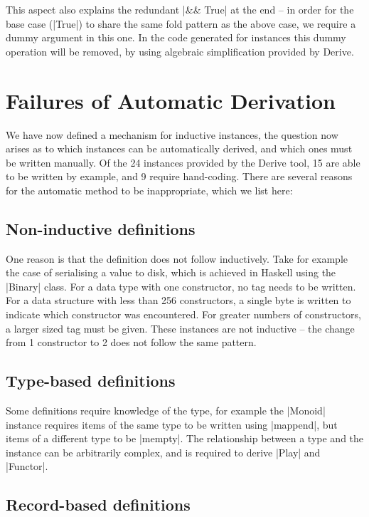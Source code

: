 \documentclass{llncs}
\begin{document}
This aspect also explains the redundant |&& True| at the end -- in order for the base case (|True|) to share the same fold pattern as the above case, we require a dummy argument in this one. In the code generated for instances this dummy operation will be removed, by using algebraic simplification provided by Derive.


\section{Failures of Automatic Derivation}
\label{sec:automatic_failure}

We have now defined a mechanism for inductive instances, the question now arises as to which instances can be automatically derived, and which ones must be written manually. Of the 24 instances provided by the Derive tool, 15 are able to be written by example, and 9 require hand-coding. There are several reasons for the automatic method to be inappropriate, which we list here:

\subsection{Non-inductive definitions}

One reason is that the definition does not follow inductively. Take for example the case of serialising a value to disk, which is achieved in Haskell using the |Binary| class. For a data type with one constructor, no tag needs to be written. For a data structure with less than 256 constructors, a single byte is written to indicate which constructor was encountered. For greater numbers of constructors, a larger sized tag must be given. These instances are not inductive -- the change from 1 constructor to 2 does not follow the same pattern.

\subsection{Type-based definitions}

Some definitions require knowledge of the type, for example the |Monoid| instance requires items of the same type to be written using |mappend|, but items of a different type to be |mempty|. The relationship between a type and the instance can be arbitrarily complex, and is required to derive |Play| and |Functor|.

\subsection{Record-based definitions}
\end{document}
